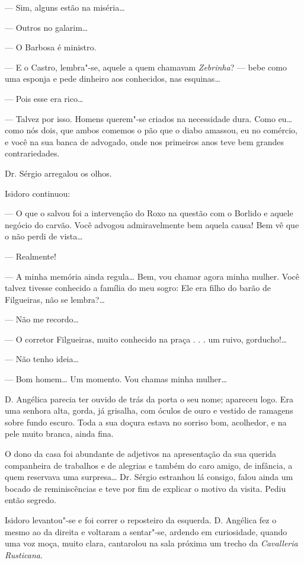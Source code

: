 --- Sim, alguns estão na miséria\ldots{}

--- Outros no galarim\ldots{}

--- O Barbosa é ministro.

--- E o Castro, lembra"-se, aquele a quem chamavam \emph{Zebrinha}? ---
bebe como uma esponja e pede dinheiro aos conhecidos, nas esquinas\ldots{}

--- Pois esse era rico\ldots{}

--- Talvez por isso. Homens querem"-se criados na necessidade dura. Como
eu\ldots{} como nós dois, que ambos comemos o pão que o diabo amassou, eu no
comércio, e você na sua banca de advogado, onde nos primeiros anos teve
bem grandes contrariedades.

Dr. Sérgio arregalou os olhos.

Isidoro continuou:

--- O que o salvou foi a intervenção do Roxo na questão com o Borlido e
aquele negócio do carvão. Você advogou admiravelmente bem aquela causa!
Bem vê que o não perdi de vista\ldots{}

--- Realmente!

--- A minha memória ainda regula\ldots{} Bem, vou chamar agora minha mulher.
Você talvez tivesse conhecido a família do meu sogro: Ele era filho do
barão de Filgueiras, não se lembra?\ldots{}

--- Não me recordo\ldots{}

--- O corretor Filgueiras, muito conhecido na praça . . . um ruivo,
gorducho!\ldots{}

--- Não tenho ideia\ldots{}

--- Bom homem\ldots{} Um momento. Vou chamas minha mulher\ldots{}

D. Angélica parecia ter ouvido de trás da porta o seu nome; apareceu
logo. Era uma senhora alta, gorda, já grisalha, com óculos de ouro e
vestido de ramagens sobre fundo escuro. Toda a sua doçura estava no
sorriso bom, acolhedor, e na pele muito branca, ainda fina.

O dono da casa foi abundante de adjetivos na apresentação da sua querida
companheira de trabalhos e de alegrias e também do caro amigo, de
infância, a quem reservava uma surpresa\ldots{} Dr. Sérgio estranhou lá
consigo, falou ainda um bocado de reminiscências e teve por fim de
explicar o motivo da visita. Pediu então segredo.

Isidoro levantou"-se e foi correr o reposteiro da esquerda. D. Angélica
fez o mesmo ao da direita e voltaram a sentar"-se, ardendo em
curiosidade, quando uma voz moça, muito clara, cantarolou na sala
próxima um trecho da \emph{Cavalleria Rusticana}.

